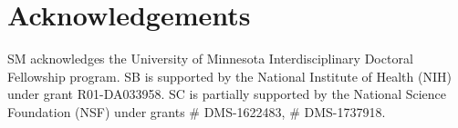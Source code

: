 \documentclass[aoas,preprint]{imsart}
\numberwithin{equation}{section}
\theoremstyle{definition}
\begin{document}







\section*{Acknowledgements}
SM acknowledges the University of Minnesota Interdisciplinary Doctoral Fellowship program. SB is supported by the National Institute of Health (NIH) under grant R01-DA033958. SC is partially supported by the National Science Foundation (NSF) under grants \# DMS-1622483, \# DMS-1737918.

%


\end{document}
